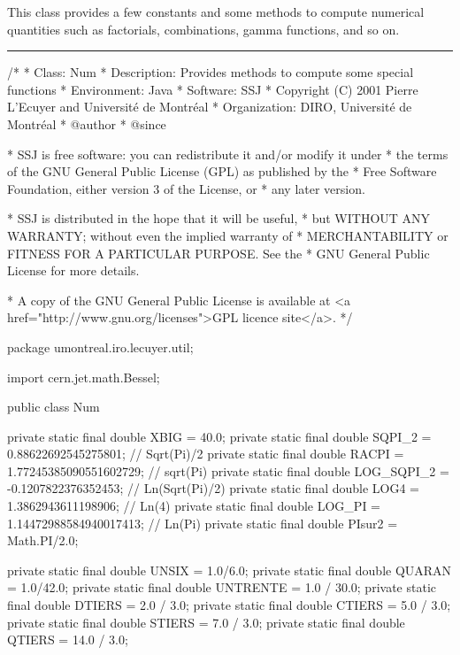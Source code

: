 
This class provides a few constants and some methods to compute numerical
quantities such as factorials, combinations, gamma functions, and so on.

\bigskip\hrule

\begin{code}
\begin{hide}
/*
 * Class:        Num
 * Description:  Provides methods to compute some special functions
 * Environment:  Java
 * Software:     SSJ
 * Copyright (C) 2001  Pierre L'Ecuyer and Université de Montréal
 * Organization: DIRO, Université de Montréal
 * @author
 * @since

 * SSJ is free software: you can redistribute it and/or modify it under
 * the terms of the GNU General Public License (GPL) as published by the
 * Free Software Foundation, either version 3 of the License, or
 * any later version.

 * SSJ is distributed in the hope that it will be useful,
 * but WITHOUT ANY WARRANTY; without even the implied warranty of
 * MERCHANTABILITY or FITNESS FOR A PARTICULAR PURPOSE.  See the
 * GNU General Public License for more details.

 * A copy of the GNU General Public License is available at
   <a href="http://www.gnu.org/licenses">GPL licence site</a>.
 */
\end{hide}
package umontreal.iro.lecuyer.util;
\begin{hide} import cern.jet.math.Bessel;\end{hide}

public class Num\begin{hide} {
   private static final double XBIG = 40.0;
   private static final double SQPI_2 = 0.88622692545275801; // Sqrt(Pi)/2
   private static final double RACPI = 1.77245385090551602729; // sqrt(Pi)
   private static final double LOG_SQPI_2 = -0.1207822376352453; // Ln(Sqrt(Pi)/2)
   private static final double LOG4 = 1.3862943611198906;   // Ln(4)
   private static final double LOG_PI = 1.14472988584940017413; // Ln(Pi)
   private static final double PIsur2 = Math.PI/2.0;

   private static final double UNSIX = 1.0/6.0;
   private static final double QUARAN = 1.0/42.0;
   private static final double UNTRENTE = 1.0 / 30.0;
   private static final double DTIERS = 2.0 / 3.0;
   private static final double CTIERS = 5.0 / 3.0;
   private static final double STIERS = 7.0 / 3.0;
   private static final double QTIERS = 14.0 / 3.0;


}
\end{hide}
\end{code}
